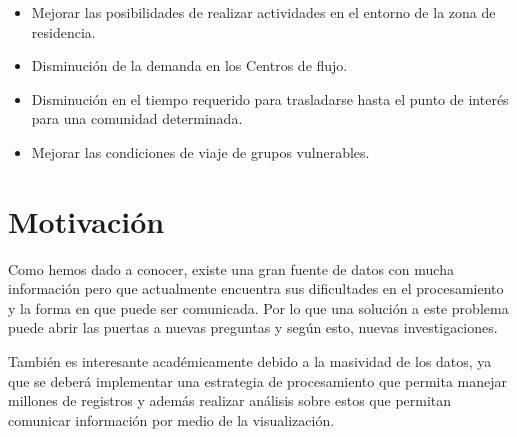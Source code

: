 \documentclass[itshape,12pt]{article}
\begin{document}
              \begin{itemize}
          \item Mejorar las posibilidades de realizar actividades en el entorno de la zona de residencia.
              \item Disminución de la demanda en los Centros de flujo.
              \item Disminución en el tiempo requerido para trasladarse hasta el punto de interés para una comunidad determinada.
              \item Mejorar las condiciones de viaje de grupos vulnerables.
              \end{itemize}




              \newpage
              \section{Motivación}


              Como hemos dado a conocer, existe una gran fuente de datos con mucha información pero que actualmente encuentra sus dificultades en el procesamiento y la forma en que puede ser comunicada. Por lo que una solución a este problema puede abrir las puertas a nuevas preguntas y según esto, nuevas investigaciones.

              También es interesante académicamente debido a la masividad de los datos, ya que se deberá implementar una estrategia de procesamiento que permita manejar millones de registros y además realizar análisis sobre estos que permitan comunicar información por medio de la visualización.
\end{document}
